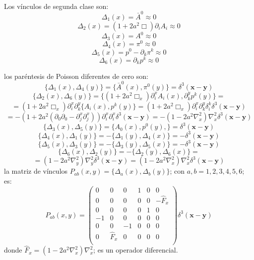\documentclass[a4paper,12pt]{article}
\begin{document}
\\

Los vínculos de segunda clase son:
\begin{equation}
\Delta_1(x)=\bar{A}^0\approx0 
\end{equation}
$$\Delta_2(x)= (1+2a^2\Box)\partial_i A_i\approx0 $$
$$ \Delta_3(x)= A^0\approx0$$
$$\Delta_4(x)=\pi^0\approx0$$
$$\Delta_5(x)=p^0-\partial_k\pi^k\approx0$$
$$\Delta_6(x)=\partial_kp^{k}\approx0 $$

los paréntesis de Poisson diferentes de cero son:
\begin{equation}
\{\Delta_1(x),\Delta_4(y)\}=\{\bar{A}^0(x),\pi^0(y)\}=\delta^3(\textbf{x}-\textbf{y})
\end{equation}
$$\{\Delta_2(x),\Delta_6(y)\}=\{(1+2a^2\Box_x)\partial_i^x A_i(x),\partial_k^yp^{k}(y)\}=$$
$$=(1+2a^2\Box_x)\partial_i^x\partial_k^y\{A_i(x),p^{k}(y)\}=(1+2a^2\Box_x)\partial_i^x\partial_k^y\delta^k_i\delta^3(\textbf{x}-\textbf{y})$$
$$=-(1+2a^2(\partial_0\partial_0-\partial_j^x\partial_j^x))\partial_i^x\partial_i^x\delta^3(\textbf{x}-\textbf{y})=-(1-2a^2\nabla^2_x)\nabla^2_x\delta^3(\textbf{x}-\textbf{y})$$
$$\{\Delta_3(x),\Delta_5(y)\}=\{A_0(x),p^0(y),\}=\delta^3(\textbf{x}-\textbf{y})$$
$$\{\Delta_4(x),\Delta_1(y)\}=-\{\Delta_1(y),\Delta_4(x)\}=-\delta^3(\textbf{x}-\textbf{y})$$
$$\{\Delta_5(x),\Delta_3(y)\}=-\{\Delta_3(y),\Delta_5(x)\}=-\delta^3(\textbf{x}-\textbf{y})$$
$$\{\Delta_6(x),\Delta_2(y)\}=-\{\Delta_2(y),\Delta_6(x)\}=$$
$$=(1-2a^2\nabla^2_y)\nabla^2_y\delta^3(\textbf{x}-\textbf{y})=(1-2a^2\nabla^2_x)\nabla^2_x\delta^3(\textbf{x}-\textbf{y})$$
la matriz de vínculos $P_{ab}(x,y)=\{\Delta_a(x),\Delta_b(y)\}$; con $a,b=1,2,3,4,5,6$; es:
\begin{equation}
P_{ab}(x,y)=\left(\begin{matrix}
0 & 0 & 0 & 1 & 0 & 0\\
 0 & 0 & 0 & 0 & 0 & -\hat{F}_x\\
 0 & 0 & 0 & 0 & 1 & 0 \\
 -1  & 0 & 0 & 0 & 0 & 0\\
 0 & 0 & -1 & 0 & 0 & 0 \\
0 & \hat{F}_x & 0 & 0 & 0 & 0 \\
\end{matrix}\right)\delta^3(\textbf{x}-\textbf{y}) 
\end{equation}
donde \mbox{$\hat{F}_x=(1-2a^2\nabla^2_x)\nabla^2_x$}; es un operador diferencial.
\vspace{0,4cm}
\end{document}

